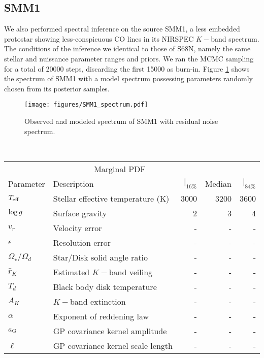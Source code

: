 \documentclass[twocolumn]{emulateapj}%
\begin{document}
\subsection{SMM1}
We also performed spectral inference on the source SMM1, a less embedded protostar showing less-conspicuous CO lines in its NIRSPEC $K-$band spectrum.  The conditions of the inference we identical to those of S68N, namely the same stellar and nuissance parameter ranges and priors.  We ran the MCMC sampling for a total of 20000 steps, discarding the first 15000 as burn-in.  Figure \ref{fig:SMM1_spectrum} shows the spectrum of SMM1 with a model spectrum possessing parameters randomly chosen from its posterior samples.

\begin{figure}
 \centering
 \texttt{[image: figures/SMM1\_spectrum.pdf]}
 \caption{Observed and modeled spectrum of SMM1 with residual noise spectrum.}
 \label{fig:SMM1_spectrum}
\end{figure}


~\clearpage

\begin{tabular}{lp{3cm}rrr}
\hline
\multicolumn{4}{c}{Marginal PDF} \\
\cline{3-5}
Parameter & Description & $|_{16\%}$& Median & $|_{84\%}$ \\
\hline
$T_\textrm{eff}$   & Stellar effective temperature  (K) &   3000 & 3200 & 3600  \\
$\log g$   & Surface gravity & 2 & 3 & 4 \\
$v_r$   & Velocity error & - & - & - \\
$\epsilon$   & Resolution error & - & - & - \\
$\Omega_\star/\Omega_d$   & Star/Disk solid angle ratio  & - & - & - \\
$\hat r_K$   & Estimated $K-$band veiling  & - & - & - \\
$T_d$   & Black body disk temperature & - & - & - \\
$A_K$   & $K-$band extinction & - & - & - \\
$\alpha$   & Exponent of reddening law & - & - & - \\
$a_{\rm G}$   & GP covariance kernel amplitude & - & - & - \\
$\ell$   & GP covariance kernel scale length & - & - & - \\
\hline
\end{tabular}

~\clearpage
\end{document}
